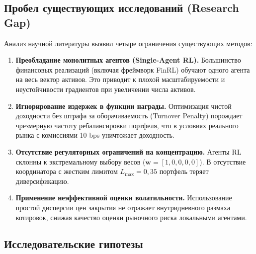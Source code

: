 \documentclass[11pt,a4paper]{article}
\begin{document}
\clearpage
\pdfpagewidth=210mm
\pdfpageheight=297mm
\restoregeometry

\subsection{Пробел существующих исследований (Research Gap)}

Анализ научной литературы выявил четыре ограничения существующих методов:
\begin{enumerate}[leftmargin=*]
\item \textbf{Преобладание монолитных агентов (Single-Agent RL).} Большинство финансовых реализаций (включая фреймворк FinRL) обучают одного агента на весь вектор активов. Это приводит к плохой масштабируемости и неустойчивости градиентов при увеличении числа активов.
\item \textbf{Игнорирование издержек в функции награды.} Оптимизация чистой доходности без штрафа за оборачиваемость (Turnover Penalty) порождает чрезмерную частоту ребалансировки портфеля, что в условиях реального рынка с комиссиями 10 bps уничтожает доходность.
\item \textbf{Отсутствие регуляторных ограничений на концентрацию.} Агенты RL склонны к экстремальному выбору весов ($\mathbf{w} = [1, 0, 0, 0, 0]$). В отсутствие координатора с жестким лимитом $L_{\max} = 0{,}35$ портфель теряет диверсификацию.
\item \textbf{Применение неэффективной оценки волатильности.} Использование простой дисперсии цен закрытия не отражает внутридневного размаха котировок, снижая качество оценки рыночного риска локальными агентами.
\end{enumerate}

\subsection{Исследовательские гипотезы}
\end{document}
